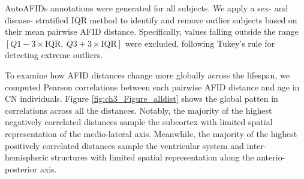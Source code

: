 AutoAFIDs annotations were generated for all subjects. We apply a sex- and disease- stratified IQR method to identify and remove outlier subjects based on their mean pairwise AFID distance. Specifically, values falling outside the range \( [Q1 - 3 \times \text{IQR},\ Q3 + 3 \times \text{IQR}] \) were excluded, following Tukey’s rule for detecting extreme outliers.

To examine how AFID distances change more globally across the lifespan, we computed Pearson correlations between each pairwise AFID distance and age in CN individuals. Figure \ref{fig:ch3_Figure_alldist} shows the global patten in correlations across all the distances. Notably, the majority of the highest negatively correlated distances sample the subcortex with limited spatial representation of the medio-lateral axis. Meanwhile, the majority of the highest positively correlated distances sample the ventricular system and inter-hemispheric structures with limited spatial representation along the anterio-posterior axis. 

